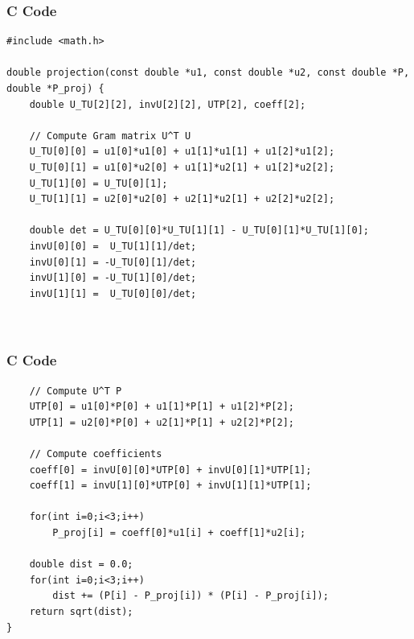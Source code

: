 \documentclass{beamer}
\begin{document}
\begin{frame}[fragile]
    \frametitle{C Code}
    \begin{lstlisting}
#include <math.h>

double projection(const double *u1, const double *u2, const double *P, double *P_proj) {
    double U_TU[2][2], invU[2][2], UTP[2], coeff[2];

    // Compute Gram matrix U^T U
    U_TU[0][0] = u1[0]*u1[0] + u1[1]*u1[1] + u1[2]*u1[2];
    U_TU[0][1] = u1[0]*u2[0] + u1[1]*u2[1] + u1[2]*u2[2];
    U_TU[1][0] = U_TU[0][1];
    U_TU[1][1] = u2[0]*u2[0] + u2[1]*u2[1] + u2[2]*u2[2];

    double det = U_TU[0][0]*U_TU[1][1] - U_TU[0][1]*U_TU[1][0];
    invU[0][0] =  U_TU[1][1]/det;
    invU[0][1] = -U_TU[0][1]/det;
    invU[1][0] = -U_TU[1][0]/det;
    invU[1][1] =  U_TU[0][0]/det;



    \end{lstlisting}
\end{frame}
\begin{frame}[fragile]
    \frametitle{C Code}
    \begin{lstlisting}
    // Compute U^T P
    UTP[0] = u1[0]*P[0] + u1[1]*P[1] + u1[2]*P[2];
    UTP[1] = u2[0]*P[0] + u2[1]*P[1] + u2[2]*P[2];

    // Compute coefficients
    coeff[0] = invU[0][0]*UTP[0] + invU[0][1]*UTP[1];
    coeff[1] = invU[1][0]*UTP[0] + invU[1][1]*UTP[1];

    for(int i=0;i<3;i++)
        P_proj[i] = coeff[0]*u1[i] + coeff[1]*u2[i];

    double dist = 0.0;
    for(int i=0;i<3;i++)
        dist += (P[i] - P_proj[i]) * (P[i] - P_proj[i]);
    return sqrt(dist);
}

    \end{lstlisting}
\end{frame}
\end{document}
